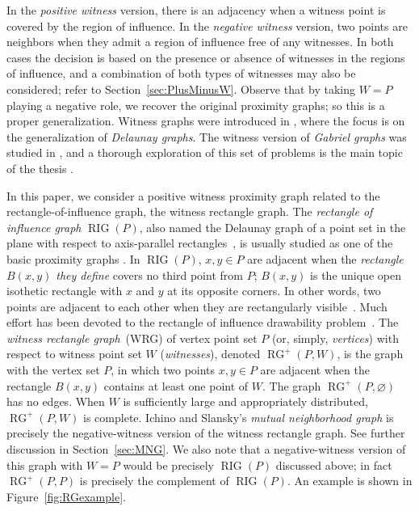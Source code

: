 \documentclass{llncs}
\DeclareMathOperator{\RG}{RG} \DeclareMathOperator{\RIG}{RIG} \DeclareMathOperator{\MNG}{MNG} \DeclareMathOperator{\GG}{GG} \DeclareMathOperator{\DG}{DG} \DeclareMathOperator{\WRG}{WRG}
\begin{document}
In the \emph{positive witness} version, there is an adjacency when
a witness point is covered by the region of influence.  In the \emph{negative witness} version,
two points are neighbors when they admit a region of influence free of any witnesses.
In both cases the decision is based on the presence or absence of witnesses
in the regions of influence, and a combination of both types of
witnesses may also be considered; refer to Section~\ref{sec:PlusMinusW}. Observe that by taking $W=P$ playing a negative role, we recover the original proximity
graphs; so this is a proper generalization.
Witness graphs were introduced in \cite{ADH}, where the focus is on the generalization of \emph{Delaunay graphs}. The witness version
of \emph{Gabriel graphs} was studied in \cite{ADH08}, and a thorough exploration of this set of problems is the main topic
of the thesis \cite{thesis}.

In this paper, we consider a positive witness proximity
graph related to the rectangle-of-influence graph, the
witness rectangle graph.  The \emph{rectangle of influence graph}
$\RIG(P)$, also named the Delaunay graph of a point set in the plane with respect to axis-parallel rectangles~\cite{Janos}, is usually studied as one of the basic proximity graphs
\cite{LLMW98,Li08}.
In $\RIG(P)$, $x,y \in P$ are adjacent when the \emph{rectangle
  $B(x,y)$ they define} covers no third point from $P$; $B(x,y)$ is
the unique open isothetic rectangle with $x$ and $y$ at its opposite corners.
In other words, two points are adjacent to each other when they are rectangularly visible~\cite{RectangularVisibility1, RectangularVisibility2, RectangularVisibility3}.
Much effort has been devoted to the rectangle of influence drawability problem~\cite{LLMW98, RectangleDrawability1, RectangleDrawability2, RectangleDrawability3, RectangleDrawability4, RectangleDrawability5, RectangleDrawability6}.
The \emph{witness rectangle graph}~(WRG) of vertex point set $P$ (or,
simply, \emph{vertices}) with respect to witness point set $W$
(\emph{witnesses}), denoted $\RG^+(P,W)$, is the graph with the vertex
set $P$, in which two points $x,y\in P$ are adjacent when the
rectangle $B(x,y)$ contains at least one point of $W$.
The graph $\RG^+(P,\varnothing)$ has no edges.  When $W$ is
sufficiently large and appropriately distributed, $\RG^+(P,W)$ is
complete. 
Ichino and Slansky's \cite{MNG} \emph{mutual neighborhood graph} 
is precisely the negative-witness version of the witness rectangle 
graph. See further discussion in Section~\ref{sec:MNG}.
We also note that a
negative-witness version of this graph with $W=P$ would be precisely
$\RIG(P)$ discussed above;
in fact $\RG^+(P,P)$ is precisely the complement of
$\RIG(P)$.     An example is shown in
Figure~\ref{fig:RGexample}. 
\end{document}
